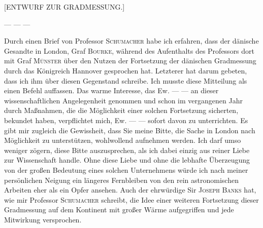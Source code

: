 \par\bigskip
{}%
\begin{center}\large [ENTWURF ZUR GRADMESSUNG.]\end{center}
\par
— — —

Durch einen Brief von Professor \textsc{Schumacher} habe ich erfahren, dass der dänische Gesandte in London, Graf \textsc{Bourke}, während des Aufenthalts des Professors dort mit Graf \textsc{Münster} über den Nutzen der Fortsetzung der dänischen Gradmessung durch das Königreich Hannover gesprochen hat. Letzterer hat darum gebeten, dass ich ihm über diesen Gegenstand schreibe. Ich musste diese Mitteilung als einen Befehl auffassen. Das warme Interesse, das Ew. — — an dieser wissenschaftlichen Angelegenheit genommen und schon im vergangenen Jahr durch Maßnahmen, die die Möglichkeit einer solchen Fortsetzung sicherten, bekundet haben, verpflichtet mich, Ew. — — sofort davon zu unterrichten. Es gibt mir zugleich die Gewissheit, dass Sie meine Bitte, die Sache in London nach Möglichkeit zu unterstützen, wohlwollend aufnehmen werden. Ich darf umso weniger zögern, diese Bitte auszusprechen, als ich dabei einzig aus reiner Liebe zur Wissenschaft handle. Ohne diese Liebe und ohne die lebhafte Überzeugung von der großen Bedeutung eines solchen Unternehmens würde ich nach meiner persönlichen Neigung ein längeres Fernbleiben von den rein astronomischen Arbeiten eher als ein Opfer ansehen. Auch der ehrwürdige Sir \textsc{Joseph Banks} hat, wie mir Professor \textsc{Schumacher} schreibt, die Idee einer weiteren Fortsetzung dieser Gradmessung auf dem Kontinent mit großer Wärme aufgegriffen und jede Mitwirkung versprochen.

